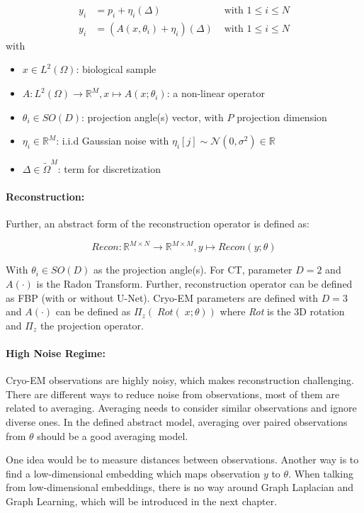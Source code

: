 \begin{equation}
    \label{eq:abstract-model}
    \begin{aligned}
        y_i &= p_i + \eta_i (\Delta) & \text{ with } 1 \leq i \leq N \\
        y_i &= \left( A(x, \theta_i) + \eta_i \right) (\Delta) & \text{ with } 1 \leq i \leq N 
    \end{aligned}
\end{equation}
with
\begin{itemize}
    \item $x \in L^2(\Omega)$: biological sample
    \item $A: L^2(\Omega) \to \mathbb{R}^M, x \mapsto A(x; \theta_i)$: a non-linear operator 
    \item $\theta_i \in SO(D)$: projection angle(s) vector, with $P$ projection dimension
    \item $\eta_i \in \mathbb{R}^M$: i.i.d Gaussian noise with $\eta_i[j] \sim \mathcal{N}(0,\sigma^2) \in \mathbb{R}$
    \item $\Delta \in \tilde{\Omega}^{M}$: term for discretization
\end{itemize}

\paragraph{Reconstruction:}

Further, an abstract form of the reconstruction operator is defined as:

\begin{equation}
    \textit{Recon} : \mathbb{R}^{M \times N} \to \mathbb{R}^{M \times M}, y \mapsto Recon(y; \theta)
\end{equation}

With $\theta_i \in SO(D)$ as the projection angle(s).
For CT, parameter $D=2$ and $A(\cdot)$ is the Radon Transform.
Further, reconstruction operator can be defined as FBP (with or without U-Net).
Cryo-EM parameters are defined with $D=3$ and $A(\cdot)$ can be
defined as $\Pi_z \left(\; \textit{Rot}(\;x; \theta) \right)$ 
where \textit{Rot} is the 3D rotation and $\Pi_z$ the projection operator.


\paragraph{High Noise Regime:}
Cryo-EM observations are highly noisy, which makes reconstruction challenging. 
There are different ways to reduce noise from observations, most of them are related to averaging. 
Averaging needs to consider similar observations and ignore diverse ones. 
In the defined abstract model, averaging over paired observations from $\theta$ should be a good averaging model.

One idea would be to measure distances between observations.
Another way is to find a low-dimensional embedding which maps observation $y$ to $\theta$.
When talking from low-dimensional embeddings, there is no way around Graph Laplacian and Graph Learning,
which will be introduced in the next chapter.

